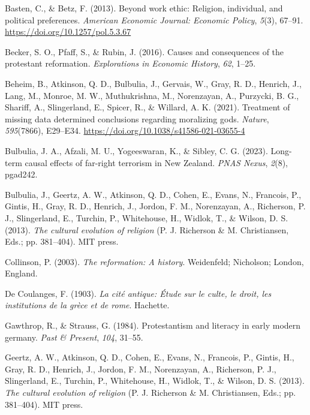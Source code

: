 \documentclass[
  single column]{article}
\newlength{\cslhangindent}
\newenvironment{CSLReferences}[2] %
 {\begin{list}{}{%
  \setlength{\itemindent}{0pt}
  \setlength{\leftmargin}{0pt}
  \setlength{\parsep}{0pt}
  \ifodd #1
   \setlength{\leftmargin}{\cslhangindent}
   \setlength{\itemindent}{-1\cslhangindent}
  \fi
  \setlength{\itemsep}{#2\baselineskip}}}
 {\end{list}}
\begin{document}
\label{refs}
\begin{CSLReferences}{1}{0}
Basten, C., \& Betz, F. (2013). Beyond work ethic: Religion, individual,
and political preferences. \emph{American Economic Journal: Economic
Policy}, \emph{5}(3), 67--91. \url{https://doi.org/10.1257/pol.5.3.67}

Becker, S. O., Pfaff, S., \& Rubin, J. (2016). Causes and consequences
of the protestant reformation. \emph{Explorations in Economic History},
\emph{62}, 1--25.

Beheim, B., Atkinson, Q. D., Bulbulia, J., Gervais, W., Gray, R. D.,
Henrich, J., Lang, M., Monroe, M. W., Muthukrishna, M., Norenzayan, A.,
Purzycki, B. G., Shariff, A., Slingerland, E., Spicer, R., \& Willard,
A. K. (2021). Treatment of missing data determined conclusions regarding
moralizing gods. \emph{Nature}, \emph{595}(7866), E29--E34.
\url{https://doi.org/10.1038/s41586-021-03655-4}

Bulbulia, J. A., Afzali, M. U., Yogeeswaran, K., \& Sibley, C. G.
(2023). Long-term causal effects of far-right terrorism in {N}ew
{Z}ealand. \emph{PNAS Nexus}, \emph{2}(8), pgad242.

Bulbulia, J., Geertz, A. W., Atkinson, Q. D., Cohen, E., Evans, N.,
Francois, P., Gintis, H., Gray, R. D., Henrich, J., Jordon, F. M.,
Norenzayan, A., Richerson, P. J., Slingerland, E., Turchin, P.,
Whitehouse, H., Widlok, T., \& Wilson, D. S. (2013). \emph{The cultural
evolution of religion} (P. J. Richerson \& M. Christiansen, Eds.; pp.
381--404). MIT press.

Collinson, P. (2003). \emph{The reformation: A history}. Weidenfeld;
Nicholson; London, England.

De Coulanges, F. (1903). \emph{La cité antique: Étude sur le culte, le
droit, les institutions de la grèce et de rome}. Hachette.

Gawthrop, R., \& Strauss, G. (1984). Protestantism and literacy in early
modern germany. \emph{Past \& Present}, \emph{104}, 31--55.

Geertz, A. W., Atkinson, Q. D., Cohen, E., Evans, N., Francois, P.,
Gintis, H., Gray, R. D., Henrich, J., Jordon, F. M., Norenzayan, A.,
Richerson, P. J., Slingerland, E., Turchin, P., Whitehouse, H., Widlok,
T., \& Wilson, D. S. (2013). \emph{The cultural evolution of religion}
(P. J. Richerson \& M. Christiansen, Eds.; pp. 381--404). MIT press.


\end{CSLReferences}
\end{document}
